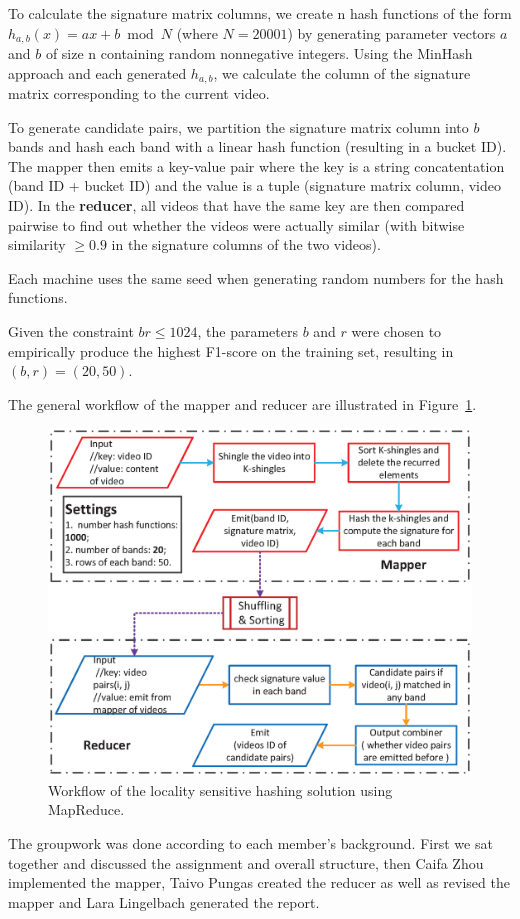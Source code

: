 \documentclass[a4paper, 11pt]{article}
\begin{document}
To calculate the signature matrix columns, we create n hash functions of the form $h_{a,b}(x) = ax + b \bmod N$ (where $N=20001$) by generating parameter vectors $a$ and $b$ of size n containing random nonnegative integers. Using the MinHash approach and each generated $h_{a,b}$, we calculate the column of the signature matrix corresponding to the current video.

To generate candidate pairs, we partition the signature matrix column into $b$ bands and hash each band with a linear hash function (resulting in a bucket ID). The mapper then emits a key-value pair where the key is a string concatentation (band ID + bucket ID) and the value is a tuple (signature matrix column, video ID). In the \textbf{reducer}, all videos that have the same key are then compared pairwise to find out whether the videos were actually similar (with bitwise similarity $\geq 0.9$ in the signature columns of the two videos).

Each machine uses the same seed when generating random numbers for the hash functions.

Given the constraint $ br \leq 1024 $, the parameters $b$ and $r$ were chosen to empirically produce the highest F1-score on the training set, resulting in $(b, r)=(20, 50)$.

The general workflow of the mapper and reducer are illustrated in Figure~\ref{fig: Digraph}. 

\begin{figure}[!htb]
\centering
\includegraphics[scale=.7]{workflow_project_1.eps}
\caption{Workflow of the locality sensitive hashing solution using MapReduce.}
\label{fig: Digraph}
\end{figure}

The groupwork was done according to each member's background. First we sat together and discussed the assignment and overall structure, then Caifa Zhou implemented the mapper, Taivo Pungas created the reducer as well as revised the mapper and Lara Lingelbach generated the report. 
\end{document}
